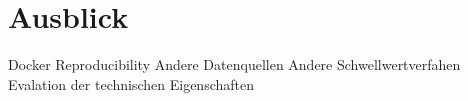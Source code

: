 \newpage
\restoregeometry
\section{Ausblick}
Docker
Reproducibility
Andere Datenquellen
Andere Schwellwertverfahen
Evalation der technischen Eigenschaften



